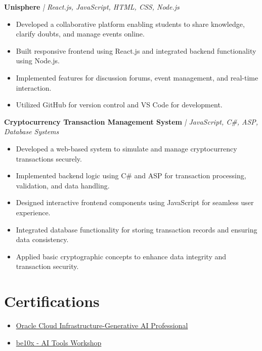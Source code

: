 \documentclass[letterpaper,11pt]{article}
\begin{document}
\vspace{2pt} %
\noindent\textbf{Unisphere} \href{https://github.com/sandeep2421-hub/unispheremain}{\faGithub}
\textit{| React.js, JavaScript, HTML, CSS, Node.js}
\begin{itemize}[leftmargin=*]
\item Developed a collaborative platform enabling students to share knowledge, clarify doubts, and manage events online.
\item Built responsive frontend using React.js and integrated backend functionality using Node.js.
\item Implemented features for discussion forums, event management, and real-time interaction.
\item Utilized GitHub for version control and VS Code for development.
\end{itemize}

\vspace{2pt}
\noindent\textbf{Cryptocurrency Transaction Management System} \href{https://github.com/sandeep2421-hub/Final}{\faGithub}
\textit{| JavaScript, C\#, ASP, Database Systems}
\begin{itemize}[leftmargin=*]
\item Developed a web-based system to simulate and manage cryptocurrency transactions securely.
\item Implemented backend logic using C\# and ASP for transaction processing, validation, and data handling.
\item Designed interactive frontend components using JavaScript for seamless user experience.
\item Integrated database functionality for storing transaction records and ensuring data consistency.
\item Applied basic cryptographic concepts to enhance data integrity and transaction security.
\end{itemize}

\section{Certifications}
\begin{itemize}[leftmargin=*]
\item \href{https://drive.google.com/file/d/1pGzEp6mVNMxDVdIWfQD4gwpLNjr1_nXB/view}{Oracle Cloud Infrastructure-Generative AI Professional}
\item \href{https://drive.google.com/file/d/1fon1Q70IRIi-CUzxfbQj0hSG54qMS9z2/view?usp=sharing}{be10x - AI Tools Workshop}
\end{itemize}
\end{document}
